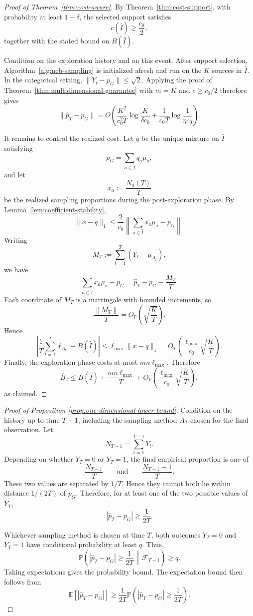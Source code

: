 \documentclass[twoside]{article}
\begin{document}
\begin{proof}[Proof of Theorem~\ref{thm:cost-aware}]
By Theorem~\ref{thm:cost-support}, with probability at least
\(1-\delta\), the selected support satisfies
\[
c(\widehat I)\ge \frac{c_0}{2},
\]
together with the stated bound on \(B(\widehat I)\).

Condition on the exploration history and on this event. After support
selection, Algorithm~\ref{alg:ucb-sampling} is initialized afresh and run
on the \(K\) sources in \(\widehat I\). In the categorical setting,
\(\|Y_t-p_G\|\le\sqrt2\). Applying the proof of
Theorem~\ref{thm:multidimensional-guarantee} with \(m=K\) and
\(c\ge c_0/2\) therefore gives
\[
\|\widehat p_T-p_G\|
=
O\!\left(
\frac{K^2}{c_0^2T}
\log\frac{K}{\delta c_0}
+
\frac{1}{c_0T}
\log\frac{1}{\eta c_0}
\right).
\]

It remains to control the realized cost. Let \(q\) be the unique mixture on
\(\widehat I\) satisfying
\[
p_G=\sum_{a\in\widehat I}q_a\mu_a,
\]
and let
\[
x_a:=\frac{N_a(T)}{T}
\]
be the realized sampling proportions during the post-exploration phase.
By Lemma~\ref{lem:coefficient-stability},
\[
\|x-q\|_1
\le
\frac{2}{c_0}
\left\|
\sum_{a\in\widehat I}x_a\mu_a-p_G
\right\|.
\]
Writing
\[
M_T:=\sum_{t=1}^T(Y_t-\mu_{A_t}),
\]
we have
\[
\sum_{a\in\widehat I}x_a\mu_a-p_G
=
\widehat p_T-p_G-\frac{M_T}{T}.
\]
Each coordinate of \(M_T\) is a martingale with bounded increments, so
\[
\frac{\|M_T\|}{T}
=
O_{\mathbb P}\!\left(\sqrt{\frac KT}\right).
\]
Hence
\[
\left|
\frac1T\sum_{t=1}^T\ell_{A_t}
-
B(\widehat I)
\right|
\le
\ell_{\max}\|x-q\|_1
=
O_{\mathbb P}\!\left(
\frac{\ell_{\max}}{c_0}\sqrt{\frac KT}
\right).
\]
Finally, the exploration phase costs at most \(mn\ell_{\max}\). Therefore
\[
\overline B_T
\le
B(\widehat I)
+
\frac{mn\ell_{\max}}{T}
+
O_{\mathbb P}\!\left(
\frac{\ell_{\max}}{c_0}\sqrt{\frac KT}
\right),
\]
as claimed.
\end{proof}
\begin{proof}[Proof of Proposition \ref{prop:one-dimensional-lower-bound}]
Condition on the history up to time \(T-1\), including the sampling
method \(A_T\) chosen for the final observation. Let
\[
N_{T-1}=\sum_{t=1}^{T-1}Y_t.
\]
Depending on whether \(Y_T=0\) or \(Y_T=1\), the final empirical
proportion is one of
\[
\frac{N_{T-1}}{T}
\qquad\text{and}\qquad
\frac{N_{T-1}+1}{T}.
\]
These two values are separated by \(1/T\). Hence they cannot both lie
within distance \(1/(2T)\) of \(p_G\). Therefore, for at least one of the
two possible values of \(Y_T\),
\[
\left|\widehat p_T-p_G\right|
\geq \frac{1}{2T}.
\]

Whichever sampling method is chosen at time \(T\), both outcomes
\(Y_T=0\) and \(Y_T=1\) have conditional probability at least \(q\).
Thus,
\[
\mathbb P\left(
\left|\widehat p_T-p_G\right|
\geq \frac{1}{2T}
\,\middle|\,\mathcal F_{T-1}
\right)
\geq q.
\]
Taking expectations gives the probability bound. The expectation bound
then follows from
\[
\mathbb E\left[
\left|\widehat p_T-p_G\right|
\right]
\geq
\frac{1}{2T}
\mathbb P\left(
\left|\widehat p_T-p_G\right|
\geq \frac{1}{2T}
\right).
\]
\end{proof}
\end{document}
